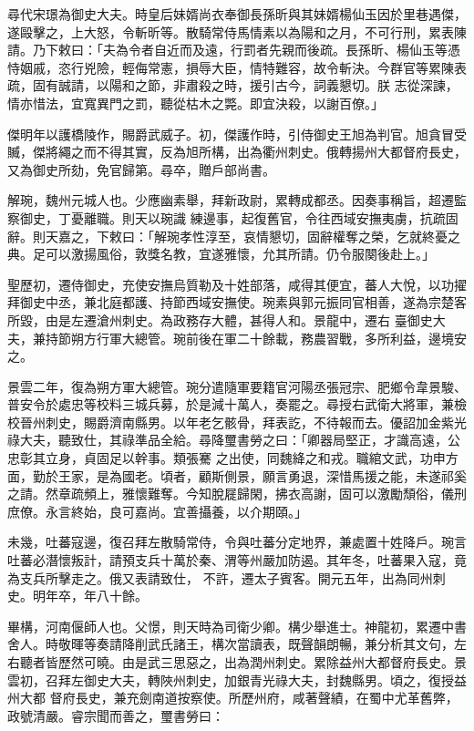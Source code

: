 \begin{pinyinscope}
 尋代宋璟為御史大夫。時皇后妹婿尚衣奉御長孫昕與其妹婿楊仙玉因於里巷遇傑，遂毆擊之，上大怒，令斬昕等。散騎常侍馬情素以為陽和之月，不可行刑，累表陳請。乃下敕曰：「夫為令者自近而及遠，行罰者先親而後疏。長孫昕、楊仙玉等憑恃姻戚，恣行兇險，輕侮常憲，損辱大臣，情特難容，故令斬決。今群官等累陳表疏，固有誠請，以陽和之節，非肅殺之時，援引古今，詞義懇切。朕
 志從深諫，情亦惜法，宜寬異門之罰，聽從枯木之斃。即宜決殺，以謝百僚。」



 傑明年以護橋陵作，賜爵武威子。初，傑護作時，引侍御史王旭為判官。旭貪冒受贓，傑將繩之而不得其實，反為旭所構，出為衢州刺史。俄轉揚州大都督府長史，又為御史所劾，免官歸第。尋卒，贈戶部尚書。



 解琬，魏州元城人也。少應幽素舉，拜新政尉，累轉成都丞。因奏事稱旨，超遷監察御史，丁憂離職。則天以琬識
 練邊事，起復舊官，令往西域安撫夷虜，抗疏固辭。則天嘉之，下敕曰：「解琬孝性淳至，哀情懇切，固辭權奪之榮，乞就終憂之典。足可以激揚風俗，敦獎名教，宜遂雅懷，允其所請。仍令服闋後赴上。」



 聖歷初，遷侍御史，充使安撫烏質勒及十姓部落，咸得其便宜，蕃人大悅，以功擢拜御史中丞，兼北庭都護、持節西域安撫使。琬素與郭元振同官相善，遂為宗楚客所毀，由是左遷滄州刺史。為政務存大體，甚得人和。景龍中，遷右
 臺御史大夫，兼持節朔方行軍大總管。琬前後在軍二十餘載，務農習戰，多所利益，邊境安之。



 景雲二年，復為朔方軍大總管。琬分遣隨軍要籍官河陽丞張冠宗、肥鄉令韋景駿、普安令於處忠等校料三城兵募，於是減十萬人，奏罷之。尋授右武衛大將軍，兼檢校晉州刺史，賜爵濟南縣男。以年老乞骸骨，拜表訖，不待報而去。優詔加金紫光祿大夫，聽致仕，其祿準品全給。尋降璽書勞之曰：「卿器局堅正，才識高遠，公忠彰其立身，貞固足以幹事。類張騫
 之出使，同魏絳之和戎。職綰文武，功申方面，勤於王家，是為國老。頃者，顧斯側景，願言勇退，深惜馬援之能，未遂祁奚之請。然章疏頻上，雅懷難奪。今知脫屣歸閑，拂衣高謝，固可以激勵頹俗，儀刑庶僚。永言終始，良可嘉尚。宜善攝養，以介期頤。」



 未幾，吐蕃寇邊，復召拜左散騎常侍，令與吐蕃分定地界，兼處置十姓降戶。琬言吐蕃必潛懷叛計，請預支兵十萬於秦、渭等州嚴加防遏。其年冬，吐蕃果入寇，竟為支兵所擊走之。俄又表請致仕，
 不許，遷太子賓客。開元五年，出為同州刺史。明年卒，年八十餘。



 畢構，河南偃師人也。父憬，則天時為司衛少卿。構少舉進士。神龍初，累遷中書舍人。時敬暉等奏請降削武氏諸王，構次當讀表，既聲韻朗暢，兼分析其文句，左右聽者皆歷然可曉。由是武三思惡之，出為潤州刺史。累除益州大都督府長史。景雲初，召拜左御史大夫，轉陜州刺史，加銀青光祿大夫，封魏縣男。頃之，復授益州大都
 督府長史，兼充劍南道按察使。所歷州府，咸著聲績，在蜀中尤革舊弊，政號清嚴。睿宗聞而善之，璽書勞曰：




\end{pinyinscope}

